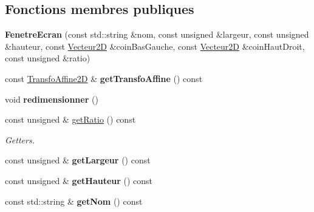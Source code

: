 \subsection*{Fonctions membres publiques}
\begin{DoxyCompactItemize}
\item 
\mbox{\label{class_fenetre_ecran_a47ffd892fcd19b88ee4155c9f8e7bdb6}} 
{\bfseries Fenetre\+Ecran} (const std\+::string \&nom, const unsigned \&largeur, const unsigned \&hauteur, const \mbox{\hyperlink{class_vecteur2_d}{Vecteur2D}} \&coin\+Bas\+Gauche, const \mbox{\hyperlink{class_vecteur2_d}{Vecteur2D}} \&coin\+Haut\+Droit, const unsigned \&ratio)
\item 
\mbox{\label{class_fenetre_ecran_a29ecd8e6c4f773b85b5e344b0ebb67da}} 
const \mbox{\hyperlink{class_transfo_affine2_d}{Transfo\+Affine2D}} \& {\bfseries get\+Transfo\+Affine} () const
\item 
\mbox{\label{class_fenetre_ecran_a7ce7ccc7851d631afd3ac24daed40688}} 
void {\bfseries redimensionner} ()
\item 
\mbox{\label{class_fenetre_ecran_a3a4e5cf7431f2a16530d297a9a3a5ea6}} 
const unsigned \& \mbox{\hyperlink{class_fenetre_ecran_a3a4e5cf7431f2a16530d297a9a3a5ea6}{get\+Ratio}} () const
\begin{DoxyCompactList}\small\item\em Getters. \end{DoxyCompactList}\item 
\mbox{\label{class_fenetre_ecran_aa9424ea54ea0e9296522c53aeba8eb54}} 
const unsigned \& {\bfseries get\+Largeur} () const
\item 
\mbox{\label{class_fenetre_ecran_a39f1bb797e7e8959becdf749e6375eb3}} 
const unsigned \& {\bfseries get\+Hauteur} () const
\item 
\mbox{\label{class_fenetre_ecran_a8f46cab96060e09b4f9ddce25139e362}} 
const std\+::string \& {\bfseries get\+Nom} () const
\item 
\mbox{\label{class_fenetre_ecran_af914092b4e31c40078139552073af215}} 

\end{DoxyCompactItemize}

